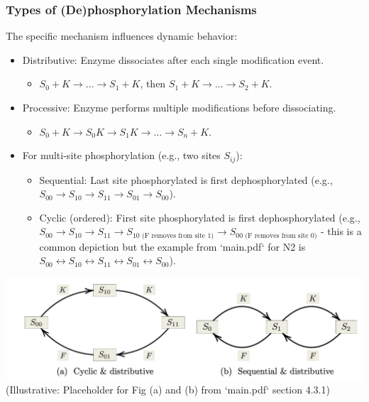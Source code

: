 \documentclass[aspectratio=169]{beamer}
\begin{document}
\begin{frame}{\insertsectionhead}
	\frametitle{Types of (De)phosphorylation Mechanisms}
	The specific mechanism influences dynamic behavior:
	\begin{itemize}
		\item \alert{Distributive}: Enzyme dissociates after each single modification event.
			\begin{itemize}
				\item $S_0 + K \to \dots \to S_1 + K$, then $S_1 + K \to \dots \to S_2 + K$.
			\end{itemize}
		\item \alert{Processive}: Enzyme performs multiple modifications before dissociating.
			\begin{itemize}
				\item $S_0 + K \to S_0K \to S_1K \to \dots \to S_n + K$.
			\end{itemize}
		\item For multi-site phosphorylation (e.g., two sites $S_{ij}$):
			\begin{itemize}
				\item \alert{Sequential}: Last site phosphorylated is first dephosphorylated (e.g., $S_{00} \to S_{10} \to S_{11} \to S_{01} \to S_{00}$).
				\item \alert{Cyclic (ordered)}: First site phosphorylated is first dephosphorylated (e.g., $S_{00} \to S_{10} \to S_{11} \to S_{10 \text{ (F removes from site 1)}} \to S_{00 \text{ (F removes from site 0)}}$ - this is a common depiction but the example from `main.pdf` for N2 is $S_{00} \leftrightarrow S_{10} \leftrightarrow S_{11} \leftrightarrow S_{01} \leftrightarrow S_{00}$).
			\end{itemize}
	\end{itemize}
	\centering
	\includegraphics[width=0.7\linewidth]{pics/cyclic-vs-sequential.png} \\
	\tiny (Illustrative: Placeholder for Fig (a) and (b) from `main.pdf` section 4.3.1)
\end{frame}
\end{document}
